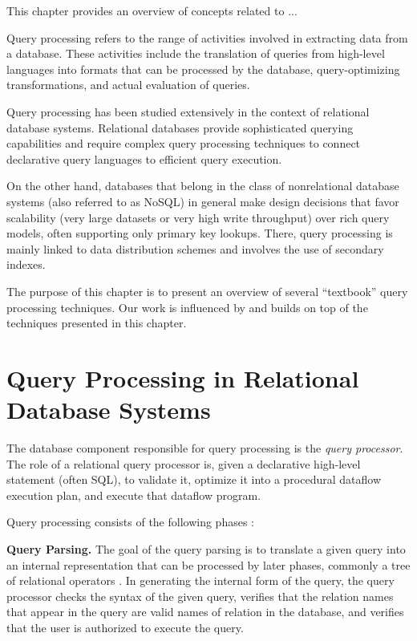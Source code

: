
This chapter provides an overview of concepts related to ...

\bigskip
\noindent
Query processing refers to the range of activities involved in extracting data from a database.
These activities include the translation of queries from high-level languages into formats that can be processed
by the database, query-optimizing transformations, and actual evaluation of queries.

Query processing has been studied extensively in the context of relational database systems.
Relational databases provide sophisticated querying capabilities and require complex query processing techniques
to connect declarative query languages to efficient query execution.

On the other hand, databases that belong in the class of nonrelational database systems (also referred to as NoSQL)
in general make design decisions that favor scalability (very large datasets or very high write throughput) over rich
query models, often supporting only primary key lookups.
There, query processing is mainly linked to data distribution schemes and involves the use of secondary indexes.

The purpose of this chapter is to present an overview of several ``textbook'' query processing techniques.
Our work is influenced by and builds on top of the techniques presented in this chapter.

\section{Query Processing in Relational Database Systems}

The database component responsible for query processing is the \textit{query processor}.
The role of a relational query processor is, given a declarative high-level statement (often SQL), to validate it,
optimize it into a procedural dataflow execution plan, and execute that dataflow program.

Query processing consists of the following phases \cite{hellerstein:databasearchitecture, kossmann:distqeuryprocessing}:

\bigskip
\noindent
\textbf{Query Parsing.}
The goal of the query parsing is to translate a given query into an internal representation that can
be processed by later phases, commonly a tree of relational operators \cite{silberschatz:dbbook}.
In generating the internal form of the query,
the query processor checks the syntax of the given query,
verifies that the relation names that appear in the query are valid names of relation in the database,
and verifies that the user is authorized to execute the query.

